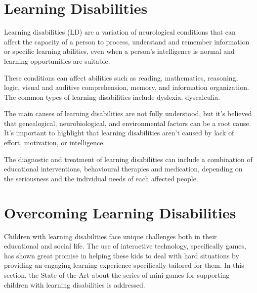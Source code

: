 \section{Learning Disabilities}
\label{section:learningdisabilityexplanation}
Learning disabilities (LD) are a variation of neurological conditions that can affect the capacity of a person to process, understand and remember information or specific learning abilities, even when a person’s intelligence is normal and learning opportunities are suitable. 

These conditions can affect abilities such as reading, mathematics, reasoning, logic, visual and auditive comprehension, memory, and information organization. The common types of learning disabilities include dyslexia, dyscalculia.%

The main causes of learning disabilities are not fully understood, but it’s believed that genealogical, neurobiological, and environmental factors can be a root cause. It’s important to highlight that learning disabilities aren’t caused by lack of effort, motivation, or intelligence. 

The diagnostic and treatment of learning disabilities can include a combination of educational interventions, behavioural therapies and medication, depending on the seriousness and the individual needs of each affected people.

\newpage
\section{Overcoming Learning Disabilities}
\label{sec:lds}

Children with learning disabilities face unique challenges both in their educational and social life. The use of interactive technology, specifically games, has shown great promise in helping these kids to deal with hard situations by providing an engaging learning experience specifically tailored for them. In this section, the State-of-the-Art about the series of mini-games for supporting children with learning disabilities is addressed.


